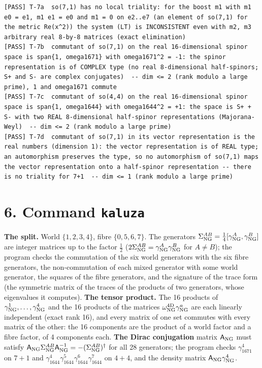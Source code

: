 \documentclass[
  10pt,
]{article}
\begin{document}
\begin{verbatim}
[PASS] T-7a  so(7,1) has no local triality: for the boost m1 with m1 e0 = e1, m1 e1 = e0 and m1 = 0 on e2..e7 (an element of so(7,1) for the metric Re(x^2)) the system (LT) is INCONSISTENT even with m2, m3 arbitrary real 8-by-8 matrices (exact elimination)
[PASS] T-7b  commutant of so(7,1) on the real 16-dimensional spinor space is span{1, omega1671} with omega1671^2 = -1: the spinor representation is of COMPLEX type (no real 8-dimensional half-spinors; S+ and S- are complex conjugates)  -- dim <= 2 (rank modulo a large prime), 1 and omega1671 commute
[PASS] T-7c  commutant of so(4,4) on the real 16-dimensional spinor space is span{1, omega1644} with omega1644^2 = +1: the space is S+ + S- with two REAL 8-dimensional half-spinor representations (Majorana-Weyl)  -- dim <= 2 (rank modulo a large prime)
[PASS] T-7d  commutant of so(7,1) in its vector representation is the real numbers (dimension 1): the vector representation is of REAL type; an automorphism preserves the type, so no automorphism of so(7,1) maps the vector representation onto a half-spinor representation -- there is no triality for 7+1  -- dim <= 1 (rank modulo a large prime)
\end{verbatim}

\hypertarget{command-kaluza}{%
\section{\texorpdfstring{6. Command
\texttt{kaluza}}{6. Command kaluza}}\label{command-kaluza}}

\textbf{The split.} World \(\{1,2,3,4\}\), fibre \(\{0,5,6,7\}\). The
generators
\(\Sigma^{AB}_{\rm NG}=\tfrac14[\gamma^A_{\rm NG},\gamma^B_{\rm NG}]\)
are integer matrices up to the factor \(\tfrac12\)
(\(2\Sigma^{AB}_{\rm NG}=\gamma^A_{\rm NG}\gamma^B_{\rm NG}\) for
\(A\ne B\)); the program checks the commutation of the six world
generators with the six fibre generators, the non-commutation of each
mixed generator with some world generator, the squares of the fibre
generators, and the signature of the trace form (the symmetric matrix of
the traces of the products of two generators, whose eigenvalues it
computes). \textbf{The tensor product.} The 16 products of
\(\gamma^1_{\rm NG},\dots,\gamma^4_{\rm NG}\) and the 16 products of the
matrices \(\omega^{\rm 4D}_{\rm NG}\gamma^a_{\rm NG}\) are each linearly
independent (exact rank 16), and every matrix of one set commutes with
every matrix of the other: the 16 components are the product of a world
factor and a fibre factor, of 4 components each. \textbf{The Dirac
conjugation} matrix \(\mathsf A_{\rm NG}\) must satisfy
\(\mathsf A_{\rm NG}\Sigma^{AB}_{\rm NG}\mathsf A_{\rm NG}^{-1}=-(\Sigma^{AB}_{\rm NG})^\dagger\)
for all 28 generators; the program checks \(\gamma^4_{1671}\) on \(7+1\)
and \(\gamma^4_{1644}\gamma^5_{1644}\gamma^6_{1644}\gamma^7_{1644}\) on
\(4+4\), and the density matrix \(\mathsf A_{\rm NG}\gamma^4_{\rm NG}\).
\end{document}
